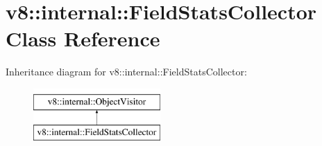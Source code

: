 \hypertarget{classv8_1_1internal_1_1FieldStatsCollector}{}\section{v8\+:\+:internal\+:\+:Field\+Stats\+Collector Class Reference}
\label{classv8_1_1internal_1_1FieldStatsCollector}
Inheritance diagram for v8\+:\+:internal\+:\+:Field\+Stats\+Collector\+:\begin{figure}[H]
\begin{center}
\leavevmode
\includegraphics[height=2.000000cm]{classv8_1_1internal_1_1FieldStatsCollector}
\end{center}
\end{figure}

